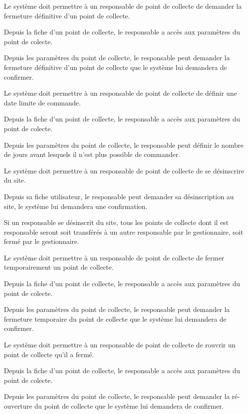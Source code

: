 \begin{reqf}{Le système doit permettre à un responsable de point de collecte de demander la fermeture définitive d'un point de collecte.}
\item Depuis la fiche d'un point de collecte, le responsable a accès aux paramètres du point de colecte.
\item Depuis les paramètres du point de collecte, le responsable peut demander la fermeture définitive d'un point de collecte que le système lui demandera de confirmer.
\end{reqf}

\begin{reqf}{Le système doit permettre à un responsable de point de collecte de définir une date limite de commande.}
\item Depuis la fiche d'un point de collecte, le responsable a accès aux paramètres du point de colecte.
\item Depuis les paramètres du point de collecte, le responsable peut définir le nombre de jours avant lesquels il n'est plus possible de commander.
\end{reqf}

\begin{reqf}{Le système doit permettre à un responsable de point de collecte de se désinscrire du site.}
\item Depuis sa fiche utilisateur, le responsable peut demander sa désinscription au site, le système lui demandera une confirmation.
\item Si un responsable se désinscrit du site, tous les points de collecte dont il est responsable seront soit transférés à un autre responsable par le gestionnaire, soit fermé par le gestionnaire.
\end{reqf}

\begin{reqf}{Le système doit permettre à un responsable de point de collecte de fermer temporairement un point de collecte.}
\item Depuis la fiche d'un point de collecte, le responsable a accès aux paramètres du point de colecte.
\item Depuis les paramètres du point de collecte, le responsable peut demander la fermeture temporaire du point de collecte que le système lui demandera de confirmer.
\end{reqf}

\begin{reqf}{Le système doit permettre à un responsable de point de collecte de rouvrir un point de collecte qu'il a fermé.}
\item Depuis la fiche d'un point de collecte, le responsable a accès aux paramètres du point de colecte.
\item Depuis les paramètres du point de collecte, le responsable peut demander la ré-ouverture du point de collecte que le système lui demandera de confirmer.
\end{reqf}

